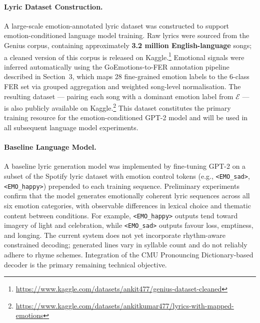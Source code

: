 \documentclass[11pt]{article}
\begin{document}
\paragraph{Lyric Dataset Construction.}
A large-scale emotion-annotated lyric dataset was constructed to support
emotion-conditioned language model training.
Raw lyrics were sourced from the Genius corpus, containing approximately
\textbf{3.2 million English-language} songs; a cleaned version of this corpus is
released on
Kaggle.\footnote{\url{https://www.kaggle.com/datasets/ankit477/genius-dataset-cleaned}}
Emotional signals were inferred automatically using the GoEmotions-to-FER annotation
pipeline described in Section~3, which maps 28 fine-grained emotion labels to the
6-class FER set via grouped aggregation and weighted song-level normalisation.
The resulting dataset --- pairing each song with a dominant emotion label from
$\mathcal{E}$ --- is also publicly available on
Kaggle.\footnote{\url{https://www.kaggle.com/datasets/ankitkumar477/lyrics-with-mapped-emotions}}
This dataset constitutes the primary training resource for the emotion-conditioned
GPT-2 model and will be used in all subsequent language model experiments.

\paragraph{Baseline Language Model.}
A baseline lyric generation model was implemented by fine-tuning GPT-2 on a subset of
the Spotify lyric dataset with emotion control tokens (e.g., \texttt{<EMO\_sad>},
\texttt{<EMO\_happy>}) prepended to each training sequence.
Preliminary experiments confirm that the model generates emotionally coherent lyric
sequences across all six emotion categories, with observable differences in lexical
choice and thematic content between conditions.
For example, \texttt{<EMO\_happy>} outputs tend toward imagery of light and celebration,
while \texttt{<EMO\_sad>} outputs favour loss, emptiness, and longing.
The current system does not yet incorporate rhythm-aware constrained decoding;
generated lines vary in syllable count and do not reliably adhere to rhyme schemes.
Integration of the CMU Pronouncing Dictionary-based decoder is the primary remaining
technical objective.



\end{document}
